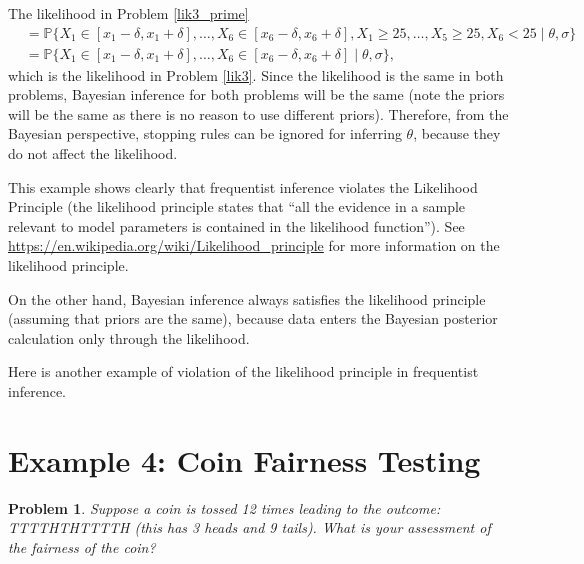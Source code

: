 \documentclass{scrartcl}
\newtheorem{problem}[theorem]{Problem}
\newcommand{\P}{{\mathbb P}}
\begin{document}
The likelihood in Problem \ref{lik3_prime}
\begin{align*}
&= \P\{X_1 \in
                                                      [x_1 - \delta,
                                                      x_1 + \delta],
                                                      \dots, X_6 \in
                                                      [x_6 - 
    \delta, x_6 + \delta], X_1 \geq 25, \dots, X_5 \ge 25, X_6 < 25
                                                      \mid \theta, \sigma \} \\
  &= \P\{X_1 \in
                                                      [x_1 - \delta,
                                                      x_1 + \delta],
                                                      \dots, X_6 \in
                                                      [x_6 - 
    \delta, x_6 + \delta]    \mid \theta, \sigma \},
\end{align*}
which is the likelihood in Problem \ref{lik3}.
Since the likelihood is the same in both problems, Bayesian inference
for both problems will be the same (note the priors will be the same
as there is no reason to use different priors). Therefore, from the
Bayesian perspective, stopping rules  can be ignored for inferring $\theta$, 
because they do not affect the likelihood.

This example shows clearly that frequentist inference
violates the Likelihood Principle (the likelihood principle states
that ``all the evidence in a sample relevant to model parameters is
contained in the likelihood function''). See
\url{https://en.wikipedia.org/wiki/Likelihood_principle} for more
information on the likelihood principle.

On the other hand, Bayesian inference always satisfies the likelihood
principle (assuming that priors are the same), because data enters the
Bayesian posterior calculation only through the likelihood. 

Here is another example of violation of the likelihood principle in
frequentist inference. 

\section{Example 4: Coin Fairness Testing}

\begin{problem}
Suppose a coin is tossed 12 times leading to the outcome: TTTTHTHTTTTH
(this has 3 heads and 9 tails). What is your assessment of the
fairness of the coin?  
\end{problem}
\end{document}
